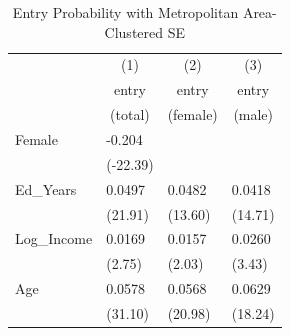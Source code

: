 



\tablespacing
\small
\begin{longtable}{p{3 cm} p{2.25 cm} p{2.25 cm} p{2.25 cm}}
\caption{Entry Probability with Metropolitan Area-Clustered SE}
\centering
\hline\hline
            &\multicolumn{1}{c}{(1)}&\multicolumn{1}{c}{(2)}&\multicolumn{1}{c}{(3)}\\
            &\multicolumn{1}{c}{entry}&\multicolumn{1}{c}{entry}&\multicolumn{1}{c}{entry}\\
            &\multicolumn{1}{c}{(total)}&\multicolumn{1}{c}{(female)}&\multicolumn{1}{c}{(male)}\\
\hline
Female      &      -0.204\sym{***}&                     &                     \\
            &    (-22.39)         &                     &                     \\
Ed\_Years    &      0.0497\sym{***}&      0.0482\sym{***}&      0.0418\sym{***}\\
            &     (21.91)         &     (13.60)         &     (14.71)         \\

Log\_Income  &      0.0169\sym{**} &      0.0157\sym{*}  &      0.0260\sym{***}\\
            &      (2.75)         &      (2.03)         &      (3.43)         \\

Age         &      0.0578\sym{***}&      0.0568\sym{***}&      0.0629\sym{***}\\
            &     (31.10)         &     (20.98)         &     (18.24)         \\


\end{longtable}
